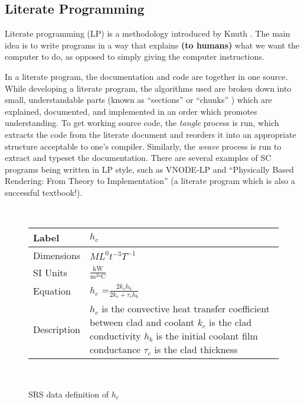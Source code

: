 \documentclass{sig-alternate-05-2015}
\newcommand{\colAwidth}{0.1\textwidth}
\newcommand{\colBwidth}{0.34\textwidth}
\begin{document}
\subsection{Literate Programming} \label{ssec:literate}

Literate programming (LP) is a methodology introduced by Knuth
\cite{Knuth1984}. The main idea is to write programs in a way that explains 
{\bf (to humans)} what we want the computer to do, as opposed to simply giving
the computer instructions.

In a literate program, the documentation and code are together in one source.
While developing a literate program, the algorithms used are broken down into
small, understandable parts (known as ``sections'' \cite{Knuth1984} or
``chunks'' \cite{JohnsonAndJohnson1997}) which are explained, documented, and
implemented in an order which promotes understanding. To get working source
code, the \textit{tangle} process is run, which extracts the code from the
literate document and reorders it into an appropriate structure acceptable
to one's compiler.  Similarly, the \textit{weave} process is run to extract and
typeset the documentation.
There are several examples of SC programs being written in LP style, such as
VNODE-LP \cite{Nedialkov2006} and ``Physically Based Rendering: From Theory to
Implementation'' \cite{PharrAndHumphreys2004} (a literate program which is also
a successful textbook!).

\begin{figure}
~\newline \noindent \begin{minipage}{\textwidth}
\begin{tabular}{p{\colAwidth} p{\colBwidth}}
Label & 
$h_{c}$
\\ \midrule
Dimensions & $ML^0t^{-3}T^{-1}$\\ \midrule
SI Units & $\mathrm{\frac{kW}{m^{2o}C}}$\\ \midrule
Equation & $h_{c}$ =$
\frac{2k_{c}h_{b}}{2k_{c}+\tau_{c}h_{b}}$\\ \midrule
Description &  $h_{c}$ is the convective heat transfer coefficient between clad and coolant
\newline
$k_{c}$ is the
clad conductivity \newline
$h_{b}$ is the
initial coolant film conductance \newline
$\tau_{c}$ is the
clad thickness 
\newline
\end{tabular} \end{minipage}\\ 
\caption{SRS data definition of $h_c$}
\label{fig:h_c}
\end{figure}	
\end{document}
